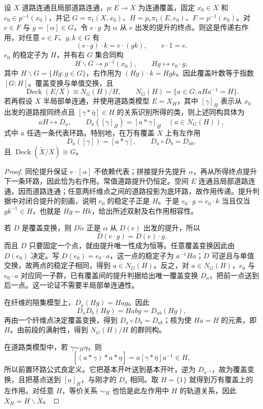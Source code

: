 \begin{proposition}\label{g2:prop:monodromy-deck}
	设 \(X\) 道路连通且局部道路连通，\(p:E\rightarrow X\) 为连通覆盖，固定 \(x_0\in X\) 和 \(e_0\in p^{-1}(x_0)\)，并记 \(G=\pi_1(X,x_0)\)、\(H=p_*\pi_1(E,e_0)\)、\(F=p^{-1}(x_0)\)。对 \(e\in F\) 与 \(g=[\alpha]\in G\)，令 \(e\cdot g\) 为 \(\alpha\) 从 \(e\) 出发的提升的终点。则这是传递右作用，对任意 \(e\in F\)、\(g,k\in G\) 有
	\[
		(e\cdot g)\cdot k=e\cdot(gk),\qquad e\cdot1=e.
	\]
	\(e_0\) 的稳定子为 \(H\)，并有右 \(G\) 集合同构
	\[
		H\backslash G\longrightarrow p^{-1}(x_0),\qquad Hg\longmapsto e_0\cdot g,
	\]
	其中 \(H\backslash G=\{Hg:g\in G\}\)，右作用为 \((Hg)\cdot k=Hgk\)。因此覆盖叶数等于指数 \([G:H]\)。覆盖变换与单值交换，且
	\[
		\operatorname{Deck}(E/X)\cong N_G(H)/H,
		\qquad N_G(H)=\{a\in G:aHa^{-1}=H\}.
	\]
	若再假设 \(X\) 半局部单连通，并使用道路类模型 \(E=X_H\)，其中 \([\gamma]_H\) 表示从 \(x_0\) 出发的道路按同终点且 \([\gamma*\bar\eta]\in H\) 的关系识别所得的类，则上述同构具体为
	\[
		aH\longmapsto D_a,\qquad D_a([\gamma]_H)=[a*\gamma]_H
		\quad(a\in N_G(H)),
	\]
	式中 \(a\) 任选一条代表环路。特别地，在万有覆盖 \(\widetilde X\) 上有左作用
	\[
		D_a([\gamma])=[a*\gamma],\qquad D_a\circ D_b=D_{ab},
	\]
	且 \(\operatorname{Deck}(\widetilde X/X)\cong G\)。
\end{proposition}
\begin{proof}
	同伦提升保证 \(e\cdot[\alpha]\) 不依赖代表；拼接提升先提升 \(\alpha\)，再从所得终点提升下一条环路，因此恰为右作用。常值道路提升仍恒定。空间 \(E\) 连通且局部道路连通，因而道路连通；任意两纤维点之间的道路投影为底环路，故作用传递。提升判据中对闭合提升的刻画，说明 \(e_0\) 的稳定子正是 \(H\)。于是 \(e_0\cdot g=e_0\cdot k\) 当且仅当 \(gk^{-1}\in H\)，也就是 \(Hg=Hk\)，给出所述双射及右作用相容性。

	若 \(D\) 是覆盖变换，则 \(D\widetilde\alpha\) 正是 \(\alpha\) 从 \(D(e)\) 出发的提升，所以
	\[
		D(e\cdot g)=D(e)\cdot g.
	\]
	而且 \(D\) 只要固定一个点，就由提升唯一性成为恒等。任意覆盖变换因此由 \(D(e_0)\) 决定。写 \(D(e_0)=e_0\cdot a\)，这一点的稳定子为 \(a^{-1}Ha\)；\(D\) 可逆且与单值交换，故两点的稳定子相同，得到 \(a\in N_G(H)\)。反之，对 \(a\in N_G(H)\)，\(e_0\) 与 \(e_0\cdot a\) 对应同一子群，已有覆盖间的提升判据给出唯一覆盖变换 \(D_a\)，把前一点送到后一点。这一论证不需要半局部单连通性。

	在纤维的陪集模型上，\(D_a(Hg)=Hag\)。因此
	\[
		D_aD_b(Hg)=Habg=D_{ab}(Hg),
	\]
	再由一个纤维点决定覆盖变换，得到 \(D_a\circ D_b=D_{ab}\)；核为使 \(Ha=H\) 的元素，即 \(H\)。由前段的满射性，得到 \(N_G(H)/H\) 的群同构。

	在道路类模型中，若 \(\gamma\sim_H\eta\)，则
	\[
		[(a*\gamma)*\overline{a*\eta}]
		=a[\gamma*\bar\eta]a^{-1}\in H,
	\]
	所以前置环路公式良定义。它把基本开叶送到基本开叶，逆为 \(D_{a^{-1}}\)，故为覆盖变换，且把基点送到 \([a]_H\)，与刚才的 \(D_a\) 相同。取 \(H=\{1\}\) 就得到万有覆盖上的左作用。对任意 \(H\)，等价关系 \(\sim_H\) 也恰是此左作用中 \(H\) 的轨道关系，因此 \(X_H=H\backslash\widetilde X\)。
\end{proof}

